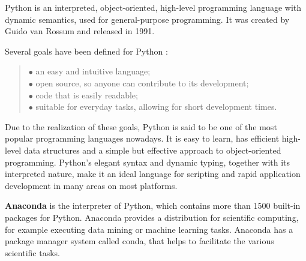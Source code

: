 Python \cite{vanderplas2016python, python-url} is an interpreted, object-oriented, high-level programming language with dynamic semantics, used for general-purpose programming. It was created by Guido van Rossum and released in 1991. \medskip

\noindent Several goals have been defined for Python \cite{van2011introduction}:
\begin{verse}
	$\bullet$ an easy and intuitive language;\\
	$\bullet$ open source, so anyone can contribute to its development;\\
	$\bullet$ code that is easily readable;\\
	$\bullet$ suitable for everyday tasks, allowing for short development times.
\end{verse}
Due to the realization of these goals, Python is said to be one of the most popular programming languages nowadays. It is easy to learn, has efficient high-level data structures and a simple but effective approach to object-oriented programming. Python's elegant syntax and dynamic typing, together with its interpreted nature, make it an ideal language for scripting and rapid application development in many areas on most platforms.\medskip

\textbf{Anaconda} is the interpreter of Python, which contains more than 1500 built-in packages for Python. Anaconda provides a distribution for scientific computing, for example executing data mining or machine learning tasks. Anaconda has a package manager system called conda, that helps to facilitate the various scientific tasks.\medskip

